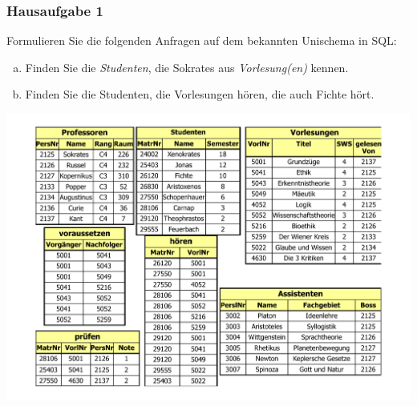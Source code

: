 \begin{frame}
	\frametitle{Hausaufgabe 1}
	\vspace{0.25cm}

	\begin{multicols}{2}
		Formulieren Sie die folgenden Anfragen auf dem bekannten Unischema in SQL:
		\begin{enumerate}[a)]
			\item Finden Sie die \textit{Studenten}, die Sokrates aus \textit{Vorlesung(en)} kennen.
			\item Finden Sie die Studenten, die Vorlesungen hören, die auch Fichte hört.
		\end{enumerate}
		\vfill\columnbreak

		\begin{center}
			\includegraphics[height=.6\paperheight]{../img/uni.pdf}
		\end{center}

	\end{multicols}
\end{frame}

